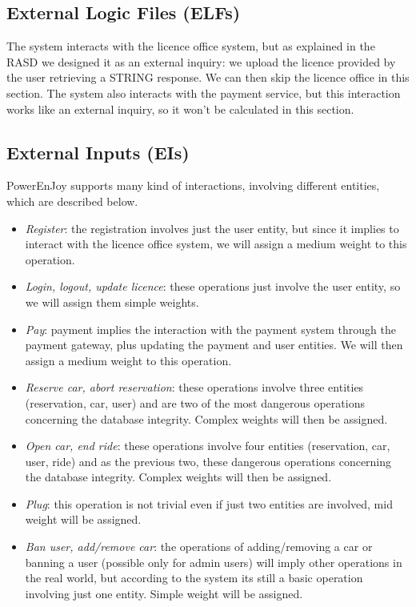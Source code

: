 \subsection{External Logic Files (ELFs)}
The system interacts with the licence office system, but as explained in the RASD we designed it as an external inquiry: we upload the licence provided by the user retrieving a STRING response. We can then skip the licence office in this section.
The system also interacts with the payment service, but this interaction works like an external inquiry, so it won't be calculated in this section.

\subsection{External Inputs (EIs)}
PowerEnJoy supports many kind of interactions, involving different entities, which are described below.
\begin{itemize}
	\item \emph{Register}: the registration involves just the user entity, but since it implies to interact with the licence office system, we will assign a medium weight to this operation.
	\item \emph{Login, logout, update licence}: these operations just involve the user entity, so we will assign them simple weights.
	\item \emph{Pay}: payment implies the interaction with the payment system through the payment gateway, plus updating the payment and user entities. We will then assign a medium weight to this operation.
	\item \emph{Reserve car, abort reservation}: these operations involve three entities (reservation, car, user) and are two of the most dangerous operations concerning the database integrity. Complex weights will then be assigned.
	\item \emph{Open car, end ride}: these operations involve four entities (reservation, car, user, ride) and as the previous two, these dangerous operations concerning the database integrity. Complex weights will then be assigned.
	\item \emph{Plug}: this operation is not trivial even if just two entities are involved, mid weight will be assigned.
	\item \emph{Ban user, add/remove car}: the operations of adding/removing a car or banning a user (possible only for admin users) will imply other operations in the real world, but according to the system its still a basic operation involving just one entity. Simple weight will be assigned.
\end{itemize}


